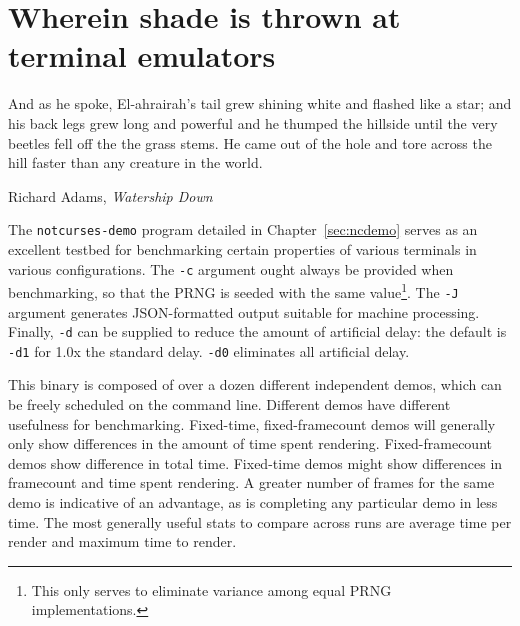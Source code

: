\section{Wherein shade is thrown at terminal emulators}
\label{sec:termshade}
\epigraph{And as he spoke, El-ahrairah's tail grew shining white and flashed like a star;
and his back legs grew long and powerful and he thumped the hillside until the
very beetles fell off the the grass stems. He came out of the hole and tore across
the hill faster than any creature in the world.}{Richard Adams, \textit{Watership Down}}
The \texttt{notcurses-demo} program detailed in Chapter~\ref{sec:ncdemo} serves
as an excellent testbed for benchmarking certain properties of various
terminals in various configurations. The \texttt{-c} argument ought always be
provided when benchmarking, so that the PRNG is seeded with the same
value\footnote{This only serves to eliminate variance among equal PRNG
implementations.}. The \texttt{-J} argument generates JSON-formatted
output suitable for machine processing. Finally, \texttt{-d} can be supplied
to reduce the amount of artificial delay: the default is \texttt{-d1} for 1.0x
the standard delay. \texttt{-d0} eliminates all artificial delay.

This binary is composed of over a dozen
different independent demos, which can be freely scheduled on the command line.
Different demos have different usefulness for benchmarking. Fixed-time, fixed-framecount
demos will generally only show differences in the amount of time spent
rendering. Fixed-framecount demos show difference in total time. Fixed-time demos
might show differences in framecount and time spent rendering. A greater
number of frames for the same demo is indicative of an advantage, as is completing
any particular demo in less time. The most generally useful stats to compare
across runs are average time per render and maximum time to render.

